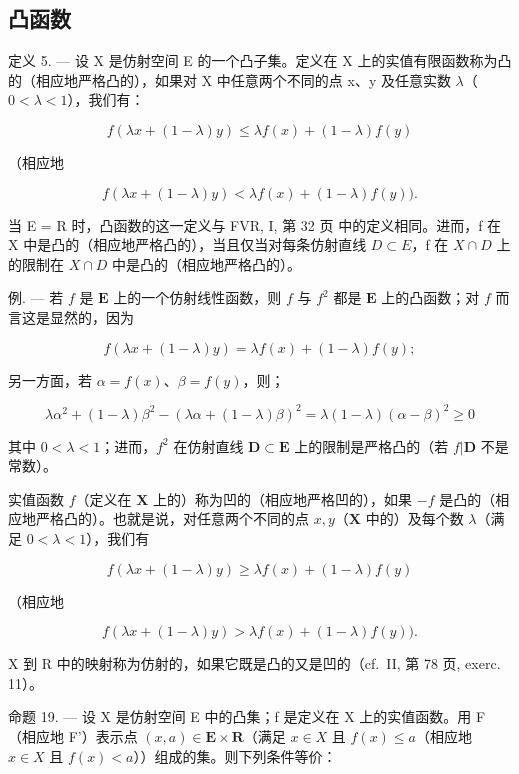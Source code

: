 \subsection{凸函数}

定义 5. --- 设 X 是仿射空间 E 的一个凸子集。定义在 X 上的实值有限函数称为凸的（相应地严格凸的），如果对 X 中任意两个不同的点 x、y 及任意实数 \(\lambda\)（\(0 < \lambda < 1\)），我们有：

\[
f (\lambda x + (1 - \lambda) y) \leqslant \lambda f (x) + (1 - \lambda) f (y)\tag{1}
\]

（相应地

\[
f (\lambda x + (1 - \lambda) y) <   \lambda f (x) + (1 - \lambda) f (y)).\tag{2}
\]

当 E = R 时，凸函数的这一定义与 FVR, I, 第 32 页 中的定义相同。进而，f 在 X 中是凸的（相应地严格凸的），当且仅当对每条仿射直线 \(D \subset E\)，f 在 \(X \cap D\) 上的限制在 \(X \cap D\) 中是凸的（相应地严格凸的）。

例. --- 若 \(f\) 是 \(\mathbf{E}\) 上的一个仿射线性函数，则 \(f\) 与 \(f^2\) 都是 \(\mathbf{E}\) 上的凸函数；对 \(f\) 而言这是显然的，因为

\[
f (\lambda x + (1 - \lambda) y) = \lambda f (x) + (1 - \lambda) f (y);
\]

另一方面，若 \(\alpha = f(x)\)、\(\beta = f(y)\)，则；

\[
\lambda \alpha^ {2} + (1 - \lambda) \beta^ {2} - (\lambda \alpha + (1 - \lambda) \beta) ^ {2} = \lambda (1 - \lambda) (\alpha - \beta) ^ {2} \geqslant 0
\]

其中 \(0 < \lambda < 1\)；进而，\(f^2\) 在仿射直线 \(\mathbf{D} \subset \mathbf{E}\) 上的限制是严格凸的（若 \(f|\mathbf{D}\) 不是常数）。

实值函数 \(f\)（定义在 \(\mathbf{X}\) 上的）称为凹的（相应地严格凹的），如果 \(-f\) 是凸的（相应地严格凸的）。也就是说，对任意两个不同的点 \(x, y\)（\(\mathbf{X}\) 中的）及每个数 \(\lambda\)（满足 \(0 < \lambda < 1\)），我们有

\[
f (\lambda x + (1 - \lambda) y) \geqslant \lambda f (x) + (1 - \lambda) f (y)
\]

（相应地

\[
f (\lambda x + (1 - \lambda) y) > \lambda f (x) + (1 - \lambda) f (y)).
\]

X 到 R 中的映射称为仿射的，如果它既是凸的又是凹的（cf.~II, 第 78 页, exerc. 11）。

命题 19. --- 设 X 是仿射空间 E 中的凸集；f 是定义在 X 上的实值函数。用 F（相应地 F'）表示点 \((x, a) \in \mathbf{E} \times \mathbf{R}\)（满足 \(x \in X\) 且 \(f(x) \leqslant a\)（相应地 \(x \in X\) 且 \(f(x) < a\)））组成的集。则下列条件等价：

